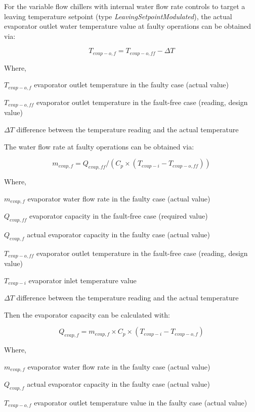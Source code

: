 For the variable flow chillers with internal water flow rate controls to target a leaving temperature setpoint (type \emph{LeavingSetpointModulated}), the actual evaporator outlet water temperature value at faulty operations can be obtained via:

\begin{equation}
T_{evap-o,f} = T_{evap-o,ff} - \Delta T
\end{equation}

Where, 

\(T_{evap-o,f}\) evaporator outlet temperature in the faulty case (actual value)

\(T_{evap-o,ff}\) evaporator outlet temperature in the fault-free case (reading, design value)

\(\Delta T\) difference between the temperature reading and the actual temperature

The water flow rate at faulty operations can be obtained via:

\begin{equation}
m_{evap,f} = Q_{evap,ff} / ( C_p \times (T_{evap-i} - T_{evap-o,ff} ) )
\end{equation}

Where, 

\(m_{evap,f}\) evaporator water flow rate in the faulty case (actual value)

\(Q_{evap,ff}\) evaporator capacity in the fault-free case (required value)

\(Q_{evap,f}\) actual evaporator capacity in the faulty case (actual value)

\(T_{evap-o,ff}\) evaporator outlet temperature in the fault-free case (reading, design value)

\(T_{evap-i}\) evaporator inlet temperature value 

\(\Delta T\) difference between the temperature reading and the actual temperature

Then the evaporator capacity can be calculated with:

\begin{equation}
Q_{evap,f} = m_{evap,f} \times C_p \times (T_{evap-i} - T_{evap-o,f} )
\end{equation}

Where, 

\(m_{evap,f}\) evaporator water flow rate in the faulty case (actual value)

\(Q_{evap,f}\) actual evaporator capacity in the faulty case (actual value)

\(T_{evap-o,f}\) evaporator outlet temperature value in the faulty case (actual value)

